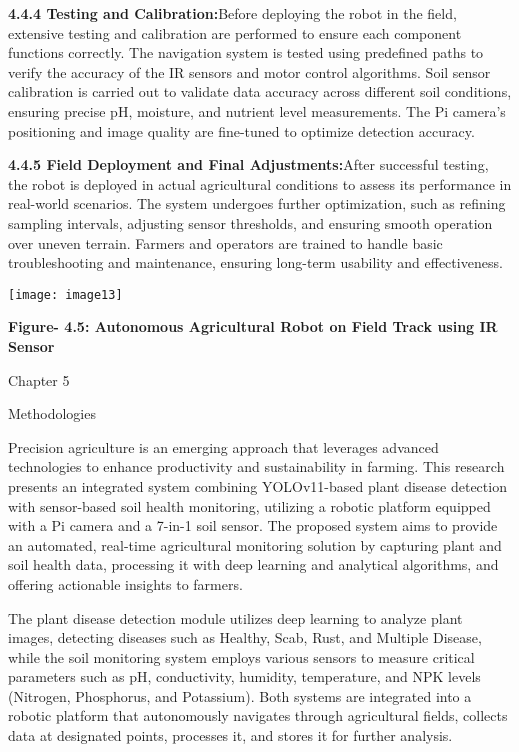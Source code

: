 \documentclass{book} %
\begin{document}
\noindent \textbf{4.4.4 Testing and Calibration:}Before deploying the robot in the field, extensive testing and calibration are performed to ensure each component functions correctly. The navigation system is tested using predefined paths to verify the accuracy of the IR sensors and motor control algorithms. Soil sensor calibration is carried out to validate data accuracy across different soil conditions, ensuring precise pH, moisture, and nutrient level measurements. The Pi camera's positioning and image quality are fine-tuned to optimize detection accuracy.

\noindent \textbf{4.4.5 Field Deployment and Final Adjustments:}After successful testing, the robot is deployed in actual agricultural conditions to assess its performance in real-world scenarios. The system undergoes further optimization, such as refining sampling intervals, adjusting sensor thresholds, and ensuring smooth operation over uneven terrain. Farmers and operators are trained to handle basic troubleshooting and maintenance, ensuring long-term usability and effectiveness.

\noindent \texttt{[image: image13]}\textbf{}

\noindent \textbf{}

\noindent \textbf{}

\noindent \textbf{Figure- 4.5: Autonomous Agricultural Robot on Field Track using IR Sensor}

\noindent 
{\eject }

\noindent 
{Chapter 5}

\noindent 
{Methodologies}

\noindent Precision agriculture is an emerging approach that leverages advanced technologies to enhance productivity and sustainability in farming. This research presents an integrated system combining YOLOv11-based plant disease detection with sensor-based soil health monitoring, utilizing a robotic platform equipped with a Pi camera and a 7-in-1 soil sensor. The proposed system aims to provide an automated, real-time agricultural monitoring solution by capturing plant and soil health data, processing it with deep learning and analytical algorithms, and offering actionable insights to farmers.

\noindent The plant disease detection module utilizes deep learning to analyze plant images, detecting diseases such as Healthy, Scab, Rust, and Multiple Disease, while the soil monitoring system employs various sensors to measure critical parameters such as pH, conductivity, humidity, temperature, and NPK levels (Nitrogen, Phosphorus, and Potassium). Both systems are integrated into a robotic platform that autonomously navigates through agricultural fields, collects data at designated points, processes it, and stores it for further analysis.
\end{document}
